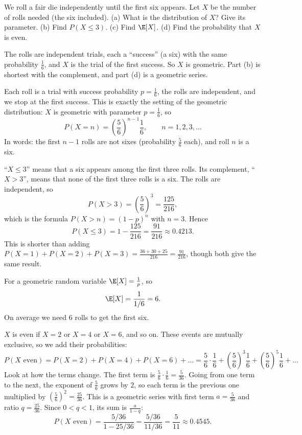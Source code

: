 
\begin{problem}
	We roll a fair die independently until the first six appears. Let $X$ be the number of
	rolls needed (the six included).
	(a) What is the distribution of $X$? Give its parameter.
	(b) Find $P(X\le 3)$.
	(c) Find $\E[X]$.
	(d) Find the probability that $X$ is even.
\end{problem}

\begin{solution}
	\idea The rolls are independent trials, each a ``success'' (a six) with the
	same probability $\frac16$, and $X$ is the trial of the first success. So
	$X$ is geometric. Part (b) is shortest with the complement, and part (d)
	is a geometric series.

	 Each roll is a trial with success probability $p=\frac16$, the
	rolls are independent, and we stop at the first success. This is exactly
	the setting of the geometric distribution: $X$ is geometric with parameter
	$p=\frac16$, so
	\[
		P(X=n)=\left(\frac56\right)^{n-1}\frac16,\qquad n=1,2,3,\dots
	\]
	In words: the first $n-1$ rolls are not sixes (probability $\frac56$
	each), and roll $n$ is a six.

	 ``$X\le3$'' means that a six appears among the first three
	rolls. Its complement, ``$X>3$'', means that none of the first three rolls
	is a six. The rolls are independent, so
	\[
		P(X>3)=\left(\frac56\right)^3=\frac{125}{216},
	\]
	which is the formula $P(X>n)=(1-p)^n$ with $n=3$. Hence
	\[
		P(X\le3)=1-\frac{125}{216}=\frac{91}{216}\approx0.4213.
	\]
	This is shorter than adding $P(X=1)+P(X=2)+P(X=3)
		=\frac{36+30+25}{216}=\frac{91}{216}$, though both give the same result.

	 For a geometric random variable $\E[X]=\frac1p$, so
	\[ \E[X]=\frac{1}{1/6}=6. \]
	On average we need $6$ rolls to get the first six.

	 $X$ is even if $X=2$ or $X=4$ or $X=6$, and so on. These events
	are mutually exclusive, so we add their probabilities:
	\[
		P(X\text{ even})=P(X=2)+P(X=4)+P(X=6)+\dots
		=\frac56\cdot\frac16+\left(\frac56\right)^3\frac16
		+\left(\frac56\right)^5\frac16+\dots
	\]
	Look at how the terms change. The first term is
	$\frac56\cdot\frac16=\frac{5}{36}$. Going from one term to the next, the
	exponent of $\frac56$ grows by $2$, so each term is the previous one
	multiplied by $\left(\frac56\right)^2=\frac{25}{36}$. This is a geometric
	series with first term $a=\frac5{36}$ and ratio $q=\frac{25}{36}$. Since
	$0<q<1$, its sum is $\frac{a}{1-q}$:
	\[
		P(X\text{ even})=\frac{5/36}{1-25/36}=\frac{5/36}{11/36}
		=\frac{5}{11}\approx0.4545.
	\]


\end{solution}
